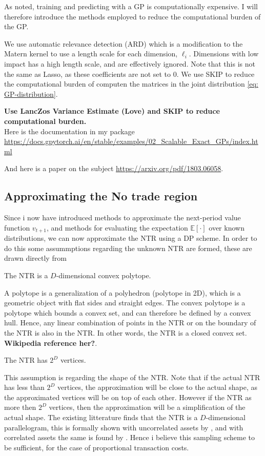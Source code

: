 \documentclass[11pt]{article}
\begin{document}
As noted, training and predicting with a \ac{GP} is computationally expensive. I will therefore introduce
the methods employed to reduce the computational burden of the \ac{GP}.

We use automatic relevance detection (ARD) which is a modification to the Matern kernel to use
a length scale for each dimension, $\ell_{i}$. Dimensions with low impact has a high length scale, and are effectively ignored.
Note that this is not the same as Lasso, as these coefficients are not set to $0$.
We use \ac{SKIP} to reduce the computational burden of computen the matrices in the joint distribution \eqref{eq: GP-distribution}.

\textbf{Use LancZos Variance Estimate (Love) and SKIP to reduce computational burden.}\\
Here is the documentation in my package 
\url{https://docs.gpytorch.ai/en/stable/examples/02_Scalable_Exact_GPs/index.html} 

And here is a paper on the subject \url{https://arxiv.org/pdf/1803.06058}.
\subsection{Approximating the No trade region} \label{Subsection: Approximating_NTR}
Since i now have introduced methods to approximate the next-period value function $v_{t+1}$, and methods for evaluating the expectation $\mathbb{E}[\cdot]$
over known distributions, we can now approximate the \ac{NTR} using a \ac{DP} scheme. In order to do this some assummptions regarding the unknown NTR are formed,
these are drawn directly from \autocite{Scheidegger2023}
\begin{assumption}\label{assumption: NTR-convex}
  The NTR is a $D$-dimensional convex polytope.
\end{assumption}
A polytope is a generalization of a polyhedron (polytope in 2D), which is a geometric object with flat sides and straight edges.
  The convex polytope is a polytope which bounds a convex set, and can therefore be defined by a convex hull. Hence, any linear combination of points in the \ac{NTR} or on the boundary of the \ac{NTR} is also in the \ac{NTR}.
  In other words, the \ac{NTR} is a closed convex set. \textbf{Wikipedia reference her?}.
\begin{assumption}\label{assumption: NTR-vertices}
  The NTR has $2^{D}$ vertices.
\end{assumption}
This assumption is regarding the shape of the \ac{NTR}. Note that if the actual \ac{NTR} has less than $2^{D}$ vertices, the approximation will be close to the actual shape, as the approximated vertices will be on top of each other.
However if the \ac{NTR} as more then $2^{D}$ vertices, then the approximation will be a simplification of the actual shape. 
The existing litterature finds that the \ac{NTR} is a $D$-dimensional parallelogram, this is formally shown with uncorrelated assets by \autocite{liu2002}, and with correlated assets the same is found by \autocite{CaiJuddXu2013,Dybvig2020}.
Hence i believe this sampling scheme to be sufficient, for the case of proportional transaction costs.
\end{document}

